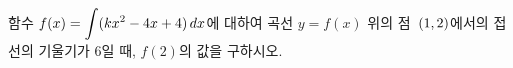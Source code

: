 함수 $f(x)=\displaystyle\int (kx^2-4x+4)\mkern3mu dx$에 대하여 곡선 $y=f(x)$ 위의 점~$(1{,}\mkern3mu\mathopen{}2)$에서의 접선의 기울기가 $6$일 때, $f(2)$의 값을 구하시오. 
